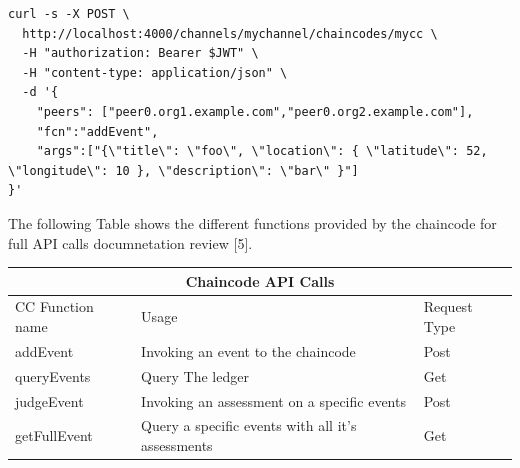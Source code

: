 \begin{lstlisting}[caption={Simple REST API Call Using Curl},captionpos=b]
curl -s -X POST \
  http://localhost:4000/channels/mychannel/chaincodes/mycc \
  -H "authorization: Bearer $JWT" \
  -H "content-type: application/json" \
  -d '{
	"peers": ["peer0.org1.example.com","peer0.org2.example.com"],
	"fcn":"addEvent",
	"args":["{\"title\": \"foo\", \"location\": { \"latitude\": 52, \"longitude\": 10 }, \"description\": \"bar\" }"]
}'
\end{lstlisting}
\bigskip
The following Table shows the different functions provided by the chaincode for full API calls documnetation review [5]. \\  

\begin{tabular}{|p{4cm}|p{6cm}|p{3cm}|  }
\hline
\multicolumn{3}{|c|}{Chaincode API Calls} \\
\hline
CC Function name& Usage &Request Type \\
\hline
addEvent & Invoking an event to the chaincode & Post \\
queryEvents & Query The ledger & Get\\
 judgeEvent &Invoking an assessment on a specific events& Post \\
getFullEvent&Query a specific events with all it's assessments& Get\\
\hline
\end{tabular}







 








 



 
  